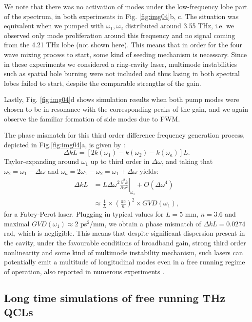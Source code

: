 \documentclass[10pt,letterpaper]{article}
\def\p{\partial}
\begin{document}
{We note that there was no activation of modes under the low-frequency lobe part of the spectrum, in both experiments in Fig. \ref{fig:img04}b, c. The situation was equivalent when we pumped with $\omega_1,\omega_2$ distributed around 3.55 THz, i.e. we observed only mode proliferation around this frequency and no signal coming from the 4.21 THz lobe (not shown here). This means that in order for the four wave mixing process to start, some kind of seeding mechanism is necessary. Since in these experiments we considered a ring-cavity laser, multimode instabilities such as spatial hole burning \cite{gordon2008multimode} were not included and thus lasing in both spectral lobes failed to start, despite the comparable strengths of the gain. 

Lastly, Fig. \ref{fig:img04}d shows simulation results when both pump modes were chosen to be in resonance with the corresponding peaks of the gain, and we again observe the familiar formation of side modes due to FWM.

The phase mismatch for this third order difference frequency generation process, depicted in Fig.\ref{fig:img04}a, is given by \cite{butcher1991elements}:
\begin{equation}
\Delta k L = \left [2k(\omega_1) - k(\omega_2)-k(\omega_a) \right ]L. 
\end{equation}
Taylor-expanding around $\omega_1$ up to third order in $\Delta \omega $, and taking that $\omega_2 = \omega_1 - \Delta \omega$ and $\omega_a =2\omega_1-\omega_2 =\omega_1 + \Delta \omega$ yields:
\begin{align}
\Delta k L & = L\Delta \omega^2 \left.\frac{\p^2 k}{\p \omega^2}\right|_{\omega_1} + O(\Delta \omega^4) \nonumber \\
&\approx \frac{1}{L}\times \left(\frac{\pi c}{n}\right)^2\times GVD(\omega_1),
\end{align}
for a Fabry-Perot laser. Plugging in typical values for $L = 5$ mm, $n=3.6$ and maximal $GVD(\omega_1) \approx 2 $ ps$^2$/mm, we obtain a phase mismatch of $\Delta k L = 0.0274$ rad, which is negligible. This means that despite significant dispersion present in the cavity, under the favourable conditions of broadband gain, strong third order nonlinearity and some kind of multimode instability mechanism, such lasers can potentially emit a multitude of longitudinal modes even in a free running regime of operation, also reported in numerous experiments \cite{wienold2014evidence,burghoff2014terahertz,hugi2012mid,rosch2015octave}.

\subsection{Long time simulations of free running THz QCLs}
\label{subsec:tdsims}

}
\end{document}
